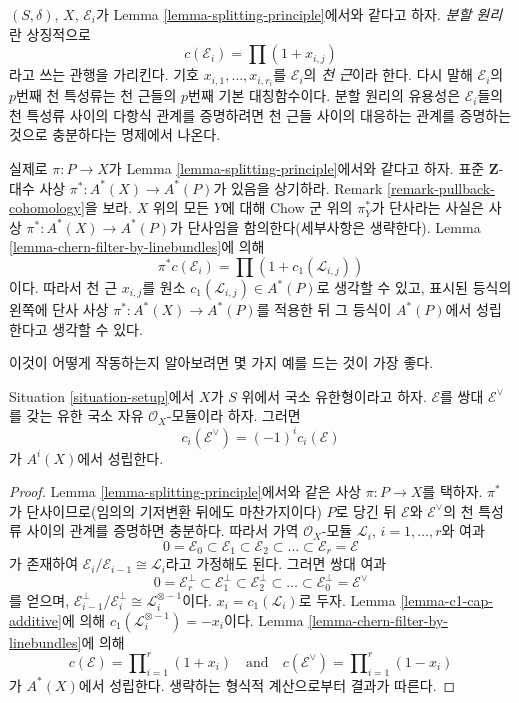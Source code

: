 \noindent
$(S, \delta)$, $X$, $\mathcal{E}_i$가 Lemma
\ref{lemma-splitting-principle}에서와 같다고 하자.
{\it 분할 원리}란 상징적으로
$$
c(\mathcal{E}_i) = \prod (1 + x_{i, j})
$$
라고 쓰는 관행을 가리킨다. 기호
$x_{i, 1}, \ldots, x_{i, r_i}$를 $\mathcal{E}_i$의
{\it 천 근}이라 한다. 다시 말해 $\mathcal{E}_i$의 $p$번째 천 특성류는
천 근들의 $p$번째 기본 대칭함수이다. 분할 원리의 유용성은
$\mathcal{E}_i$들의 천 특성류 사이의 다항식 관계를 증명하려면 천 근들
사이의 대응하는 관계를 증명하는 것으로 충분하다는 명제에서 나온다.

\medskip\noindent
실제로 $\pi : P \to X$가 Lemma \ref{lemma-splitting-principle}에서와
같다고 하자. 표준 $\mathbf{Z}$-대수 사상
$\pi^* : A^*(X) \to A^*(P)$가 있음을 상기하라. Remark
\ref{remark-pullback-cohomology}을 보라. $X$ 위의 모든 $Y$에 대해
Chow 군 위의 $\pi_Y^*$가 단사라는 사실은 사상
$\pi^* : A^*(X) \to A^*(P)$가 단사임을 함의한다(세부사항은 생략한다).
Lemma \ref{lemma-chern-filter-by-linebundles}에 의해
$$
\pi^*c(\mathcal{E}_i) = \prod (1 + c_1(\mathcal{L}_{i, j}))
$$
이다. 따라서 천 근 $x_{i, j}$를 원소
$c_1(\mathcal{L}_{i, j}) \in A^*(P)$로 생각할 수 있고, 표시된 등식의
왼쪽에 단사 사상 $\pi^* : A^*(X) \to A^*(P)$를 적용한 뒤 그 등식이
$A^*(P)$에서 성립한다고 생각할 수 있다.

\medskip\noindent
이것이 어떻게 작동하는지 알아보려면 몇 가지 예를 드는 것이 가장 좋다.

\begin{lemma}
\label{lemma-chern-classes-dual}
Situation \ref{situation-setup}에서 $X$가 $S$ 위에서 국소 유한형이라고
하자. $\mathcal{E}$를 쌍대 $\mathcal{E}^\vee$를 갖는 유한 국소 자유
$\mathcal{O}_X$-모듈이라 하자. 그러면
$$
c_i(\mathcal{E}^\vee) = (-1)^i c_i(\mathcal{E})
$$
가 $A^i(X)$에서 성립한다.
\end{lemma}

\begin{proof}
Lemma \ref{lemma-splitting-principle}에서와 같은 사상
$\pi : P \to X$를 택하자. $\pi^*$가 단사이므로(임의의 기저변환
뒤에도 마찬가지이다) $P$로 당긴 뒤 $\mathcal{E}$와
$\mathcal{E}^\vee$의 천 특성류 사이의 관계를 증명하면 충분하다.
따라서 가역 $\mathcal{O}_X$-모듈
${\mathcal L}_i$, $i = 1, \ldots, r$와 여과
$$
0 = \mathcal{E}_0 \subset \mathcal{E}_1 \subset \mathcal{E}_2
\subset \ldots \subset \mathcal{E}_r = \mathcal{E}
$$
가 존재하여
$\mathcal{E}_i/\mathcal{E}_{i - 1} \cong \mathcal{L}_i$라고
가정해도 된다. 그러면 쌍대 여과
$$
0 = \mathcal{E}_r^\perp \subset \mathcal{E}_1^\perp \subset \mathcal{E}_2^\perp
\subset \ldots \subset \mathcal{E}_0^\perp = \mathcal{E}^\vee
$$
를 얻으며,
$\mathcal{E}_{i - 1}^\perp/\mathcal{E}_i^\perp \cong
\mathcal{L}_i^{\otimes -1}$이다. $x_i = c_1(\mathcal{L}_i)$로 두자.
Lemma \ref{lemma-c1-cap-additive}에 의해
$c_1(\mathcal{L}_i^{\otimes -1}) = - x_i$이다. Lemma
\ref{lemma-chern-filter-by-linebundles}에 의해
$$
c(\mathcal{E}) = \prod\nolimits_{i = 1}^r (1 + x_i)
\quad\text{and}\quad
c(\mathcal{E}^\vee) = \prod\nolimits_{i = 1}^r (1 - x_i)
$$
가 $A^*(X)$에서 성립한다. 생략하는 형식적 계산으로부터 결과가 따른다.
\end{proof}

